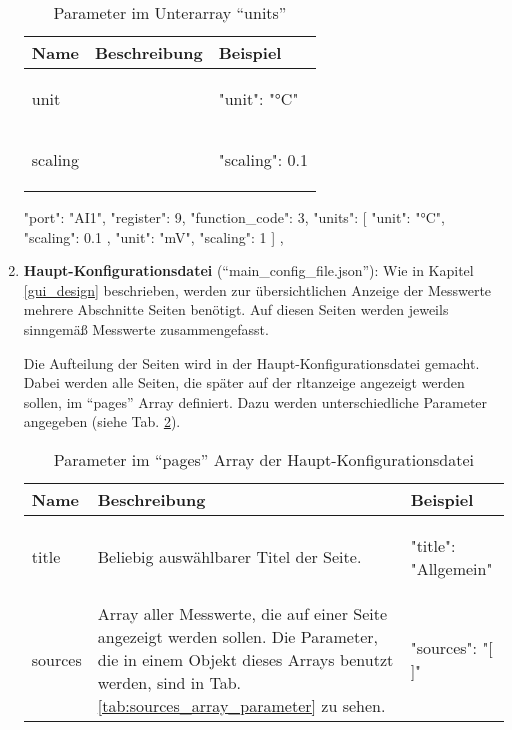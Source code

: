 \begin{enumerate}
	\begin{table}[H]
		\caption{Parameter im Unterarray \enquote{units}}
		\label{tab:pages_array_parameter}
		\begin{tabular}{p{} p{} | p{}}
			\toprule
			\textbf{Name} & \textbf{Beschreibung} & \textbf{Beispiel} \\
			\midrule
			unit      	&  & 
			\begin{jsonTable}
"unit": "°C"
			\end{jsonTable} 
			\\
			scaling 	&  & 
			\begin{jsonTable}
"scaling": 0.1
			\end{jsonTable} 
			\\
			\bottomrule
		\end{tabular}
	\end{table}
	
\begin{jsoncode}
{
	"port": "AI1",
	"register": 9,
	"function_code": 3,
	"units": [
	{
		"unit": "°C",
		"scaling": 0.1
	},
	{
		"unit": "mV",
		"scaling": 1
	}
	]
},
\end{jsoncode}
	
	\item \textbf{Haupt-Konfigurationsdatei} (\enquote{main\_config\_file.json}): Wie in Kapitel \ref{gui_design} beschrieben, werden zur übersichtlichen  Anzeige der Messwerte mehrere Abschnitte \bzw Seiten benötigt. Auf diesen Seiten werden jeweils sinngemäß Messwerte zusammengefasst. 
	
	Die Aufteilung der Seiten wird in der Haupt-Konfigurationsdatei gemacht. Dabei werden alle Seiten, die später auf der \acs{rltanzeige} angezeigt werden sollen, im \enquote{pages} Array definiert. Dazu werden unterschiedliche Parameter angegeben (siehe Tab. \ref{tab:pages_array_parameter}).
	

	\begin{table}[H]
		\caption{Parameter im \enquote{pages} Array der Haupt-Konfigurationsdatei}
		\label{tab:pages_array_parameter}
			\begin{tabular}{p{} p{} | p{}}
			\toprule
			\textbf{Name} & \textbf{Beschreibung} & \textbf{Beispiel} \\
			\midrule
			title      	& Beliebig auswählbarer Titel der Seite. & 
			\begin{jsonTable}
"title": "Allgemein"
			\end{jsonTable} 
			\\
			sources 	& Array aller Messwerte, die auf einer Seite angezeigt werden sollen. Die Parameter, die in einem Objekt dieses Arrays benutzt werden, sind in Tab. \ref{tab:sources_array_parameter} zu sehen. & 
			\begin{jsonTable}
"sources": "[ ]"
			\end{jsonTable} 
			\\
			\bottomrule
		\end{tabular}
	\end{table}
	

\end{enumerate}
